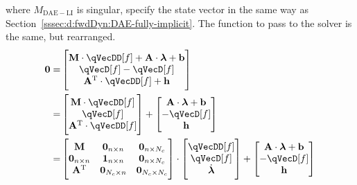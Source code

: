 \documentclass[11pt]{article}
\renewcommand{\secref}[1]{Section~\ref{#1}}
\begin{document}
where $M_{\mathrm{DAE-LI}}$ is singular, specify the state vector in the same way as \secref{sssec:d:fwdDyn:DAE-fully-implicit}. The function to pass to the solver is the same, but rearranged.
\begin{align}
    \mathbf{0} =&
    \begin{bmatrix}
        \mathbf{M} \cdot \qVecDD[f] + \mathbf{A} \cdot \bm{\lambda} + \mathbf{b} \\
        \qVecD[f] - \qVecD[f] \\
        \mathbf{A}^{\mathrm{T}} \cdot \qVecDD[f] + \mathbf{h}
    \end{bmatrix} \nonumber\\
    =&
    \begin{bmatrix}
        \mathbf{M} \cdot \qVecDD[f] \\
        \qVecD[f] \\
        \mathbf{A}^{\mathrm{T}} \cdot \qVecDD[f]
    \end{bmatrix} + \begin{bmatrix}
        \mathbf{A} \cdot \bm{\lambda} + \mathbf{b} \\
        - \qVecD[f] \\
        \mathbf{h}
    \end{bmatrix} \nonumber\\
    =&
    \begin{bmatrix}
        \mathbf{M} & \mathbf{0}_{n\times n} & \mathbf{0}_{n\times N_c} \\
        \mathbf{0}_{n\times n} & \mathbf{1}_{n\times n} & \mathbf{0}_{n\times N_c} \\
        \mathbf{A}^{\mathrm{T}} & \mathbf{0}_{N_c\times n} & \mathbf{0}_{N_c\times N_c}
    \end{bmatrix} \cdot \begin{bmatrix}
        \qVecDD[f] \\ \qVecD[f] \\ \dot{\bm{\lambda}}
    \end{bmatrix} + \begin{bmatrix}
        \mathbf{A} \cdot \bm{\lambda} + \mathbf{b} \\
        - \qVecD[f] \\
        \mathbf{h}
    \end{bmatrix}
\end{align}
\end{document}
